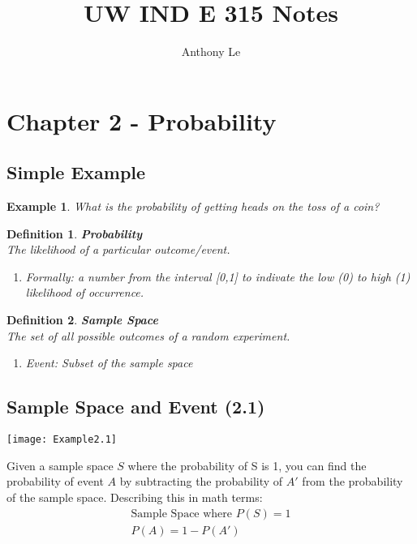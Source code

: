 \documentclass[../IND E 315.tex]{subfiles}
\title{UW IND E 315 Notes}
\author{Anthony Le}
\newtheorem{exmp}{Example}
\newtheorem{defn}{Definition}
\begin{document}
\pagestyle{fancy}
\fancyhead{}

\section*{Chapter 2 - Probability}
\subsection*{Simple Example}
\begin{exmp}
    What is the probability of getting heads on the toss of a coin?
\end{exmp}
\begin{defn}
    \textbf{Probability} \\
    The likelihood of a particular outcome/event.
    \begin{enumerate}
        \item Formally: a number from the interval [0,1] to indivate the low (0) to high (1) likelihood of occurrence.
    \end{enumerate}
\end{defn}

\begin{defn}
    \textbf{Sample Space} \\
    The set of all possible outcomes of a random experiment.
    \begin{enumerate}
        \item Event: Subset of the sample space
    \end{enumerate}
\end{defn}

\subsection*{Sample Space and Event (2.1)}
\begin{center}
    \texttt{[image: Example2.1]}
\end{center}
Given a sample space $S$ where the probability of S is 1, you can find the probability of event $A$ by subtracting the probability of $A'$ from the probability of the sample space. Describing this in math terms:
\begin{equation*}
    \begin{aligned}
        \text{Sample Space where } P(S) = 1 \\
        P(A) = 1- P(A')
    \end{aligned}
\end{equation*}
\end{document}
